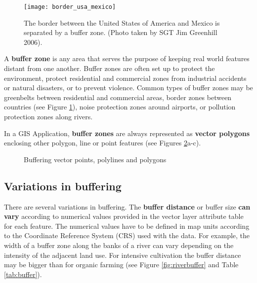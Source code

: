 \begin{figure}[ht]
   \begin{center}
   \caption{The border between the United States of America and Mexico is
separated by a buffer zone. (Photo taken by SGT Jim Greenhill 2006).}
\label{fig:mexborder}\smallskip
   \texttt{[image: border\_usa\_mexico]}
\end{center}
\end{figure}

A \textbf{buffer zone} is any area that serves the purpose of keeping real world
features distant from one another. Buffer zones are often set up to protect
the environment, protect residential and commercial zones from industrial
accidents or natural disasters, or to prevent violence. Common types of
buffer zones may be greenbelts between residential and
commercial areas, border zones between countries (see Figure
\ref{fig:mexborder}), noise protection zones around airports, or pollution
protection zones along rivers. 

\newpage

In a GIS Application, \textbf{buffer zones} are always represented as
\textbf{vector polygons} enclosing other polygon, line or point features (see
Figures \ref{fig:buffer}a-c). 

\begin{figure}[ht]
\centering
\caption{Buffering vector points, polylines and polygons}\label{fig:buffer}
   \goodgap
   \goodgap
\end{figure}

\subsection{Variations in buffering}

There are several variations in buffering. The \textbf{buffer distance} or
buffer size \textbf{can vary} according to numerical values provided in the
vector layer attribute
table for each feature. The numerical values have to be defined in map units
according to the Coordinate Reference System (CRS) used with the data.  For
example, the width of a buffer zone along the banks of a river can vary
depending on the intensity of the adjacent land use. For intensive
cultivation the buffer distance may be bigger than for organic farming (see
Figure \ref{fig:riverbuffer} and Table \ref{tab:buffer}).

